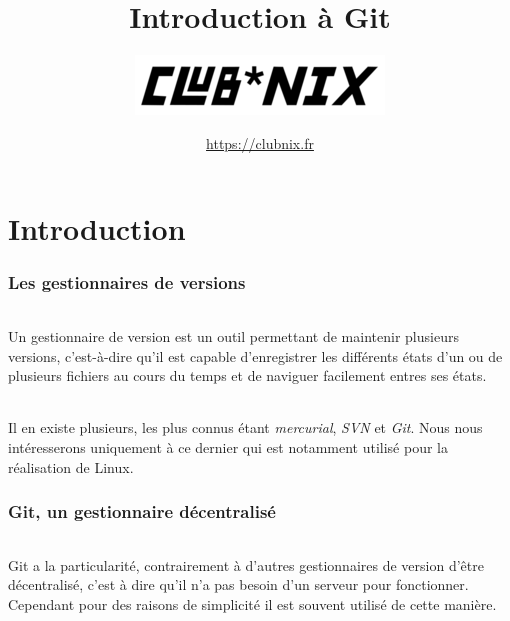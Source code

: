 \documentclass[french, a4paper, 12pt, titlepage]{article}
\begin{document}
\title{Introduction à Git}
\author{\includegraphics{clubnix}}
\date{\url{https://clubnix.fr}}

\maketitle

\vfill
\pagebreak

\newpage
\strut\thispagestyle{empty}
\vfill
\pagebreak
\tableofcontents
\strut\thispagestyle{empty}
\newpage
\setcounter{page}{1}

\part{Introduction}

\section{Les gestionnaires de versions}

\paragraph{} Un gestionnaire de version est un outil permettant de maintenir plusieurs versions, c'est-à-dire qu'il est capable d'enregistrer les différents états d'un ou de plusieurs fichiers au cours du temps et de naviguer facilement entres ses états.

\paragraph{}Il en existe plusieurs, les plus connus étant \emph{mercurial}, \emph{SVN} et \emph{Git}.  Nous nous intéresserons uniquement à ce dernier qui est notamment utilisé pour la réalisation de Linux.

\section{Git, un gestionnaire décentralisé}

\paragraph{} Git a la particularité, contrairement à d'autres gestionnaires de version d'être décentralisé, c'est à dire qu'il n'a pas besoin d'un serveur pour fonctionner.  Cependant pour des raisons de simplicité il est souvent utilisé de cette manière.
\end{document}
